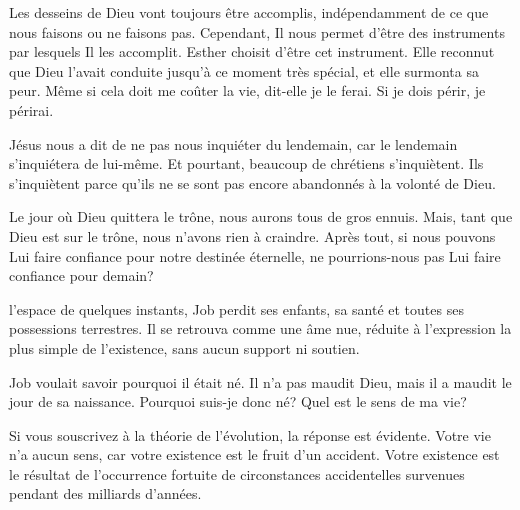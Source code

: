 Les desseins de Dieu vont toujours être accomplis,
 indépendamment de ce que nous faisons ou ne faisons pas.
 Cependant, Il nous permet d'être des instruments par lesquels Il les accomplit.
 Esther choisit d'être cet instrument.
 Elle reconnut que Dieu l'avait conduite jusqu'à ce moment très spécial,
 et elle surmonta sa peur.
 \og Même si cela doit me coûter la vie, \fg{} dit-elle \og je le ferai.
 Si je dois périr, je périrai. \fg{}

Jésus nous a dit de ne pas nous inquiéter du lendemain,
 car le lendemain s'inquiétera de lui-même.
 Et pourtant, beaucoup de chrétiens s'inquiètent.
 Ils s'inquiètent parce qu'ils ne se sont pas encore
 abandonnés à la volonté de Dieu.


Le jour où Dieu quittera le trône, nous aurons tous de gros ennuis.
 Mais, tant que Dieu est sur le trône, nous n'avons rien à craindre.
 Après tout, si nous pouvons Lui faire confiance pour notre destinée éternelle,
 ne pourrions-nous pas Lui faire confiance pour demain?

\dvrule







 l'espace de quelques instants,
 Job perdit ses enfants, sa santé et toutes ses possessions terrestres.
 Il se retrouva comme une âme nue, réduite à l'expression la plus simple
 de l'existence, sans aucun support ni soutien.


Job voulait savoir pourquoi il était né. Il n'a pas maudit Dieu,
 mais il a maudit le jour de sa naissance.
 \og Pourquoi suis-je donc né? Quel est le sens de ma vie? \fg{}

Si vous souscrivez à la théorie de l'évolution, la réponse est évidente.
 Votre vie n'a aucun sens, car votre existence est le fruit d'un accident.
 Votre existence est le résultat de l'occurrence fortuite
 de circonstances accidentelles survenues pendant des milliards d'années.

